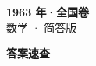 \documentclass[zihao=-4, a4paper]{ctexart}
\begin{document}
\begin{center}
  {\Large\bfseries 1963 年·全国卷}\\[4pt]
  {\large 数学 · 简答版}
\end{center}
\medskip
{}

\clearpage
{}
\begin{center}{\Large\bfseries 答案速查}\end{center}
\medskip

\end{document}
